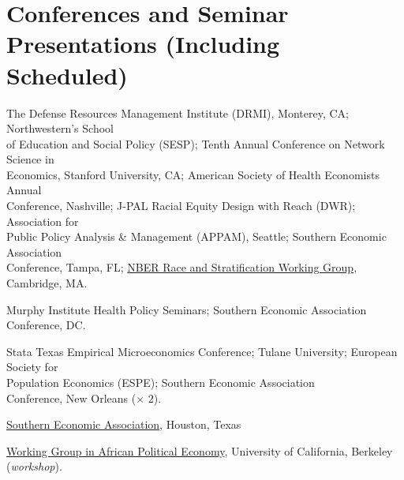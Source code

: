 \documentclass[letterpaper]{article}
\renewenvironment{itemize}{
  \begin{list}{}{
    \setlength{\leftmargin}{1.5em}
  }
}{
  \end{list}
}
\begin{document}
\section*{Conferences and Seminar Presentations (Including Scheduled)}
\vspace{2 mm}
\begin{itemize}
\item {}The Defense Resources Management Institute (DRMI), Monterey, CA; Northwestern’s School \\{\makebox[1.8cm]{\hfill}}of Education and Social Policy (SESP); Tenth Annual Conference on Network Science in  \\{\makebox[1.8cm]{\hfill}}Economics, Stanford University, CA; American Society of Health Economists Annual \\{\makebox[1.8cm]{\hfill}}Conference, Nashville; J-PAL Racial Equity Design with Reach (DWR); Association for \\{\makebox[1.8cm]{\hfill}}Public Policy Analysis \& Management (APPAM), Seattle; Southern Economic Association \\{\makebox[1.8cm]{\hfill}}Conference, Tampa, FL; \href{https://www.youtube.com/live/9j5VG4eZet8?si=H-wQVlJr51r37lvT&t=20353}{NBER Race and Stratification Working Group}, Cambridge, MA.
\item {}Murphy Institute Health Policy Seminars; Southern Economic Association \\{\makebox[1.8cm]{\hfill}}Conference, DC.
\item {}Stata Texas Empirical Microeconomics Conference; Tulane University; European Society for \\{\makebox[1.8cm]{\hfill}}Population Economics (ESPE); Southern Economic Association \\{\makebox[1.8cm]{\hfill}}Conference, New Orleans ($\times$ 2).
\item {}\href{https://www.southerneconomic.org/session-details/?conferenceId=7&eventId=3353}%
{Southern Economic Association}, Houston, Texas
\item {}\href{https://cega.berkeley.edu/initiative/working-group-in-african-political-economy/}%
{Working Group in African Political Economy}, University of  California, Berkeley (\textit{workshop}).

\end{itemize}
\end{document}
